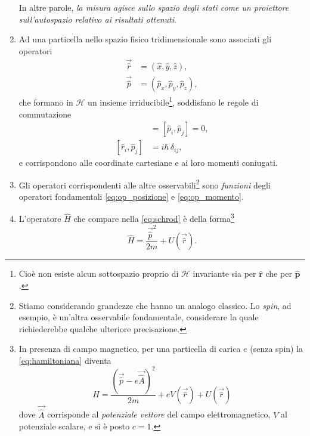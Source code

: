 \begin{enumerate}
{    In altre parole, \emph{la misura agisce sullo spazio degli stati come
    un \emph{proiettore} sull'autospazio 
    relativo ai risultati ottenuti}.
  }
  \item{
    Ad una particella nello spazio fisico tridimensionale sono associati
    gli operatori
    \begin{align}
      \vec{\hat{r}} &=  (\hat{x},   \hat{y},    \hat{z}), 
        \label{eq:op_posizione} \\
      \vec{\hat{p}} &=  (\hat{p}_x, \hat{p}_y,  \hat{p}_z),
        \label{eq:op_momento}
    \end{align}
    che formano in $\mathcal{H}$ un insieme irriducibile\footnote{
      Cioè non esiste alcun sottospazio proprio di $\mathcal{H}$ 
      invariante sia per $\mathbf{\hat{r}}$ che per $\mathbf{\hat{p}}$.
    }, soddisfano le regole di commutazione
    \begin{align}
      [\hat{r}_i, \hat{r}_j] &= [\hat{p}_i, \hat{p}_j] = 0, 
      	\label{eq:commutaz_qq_pp} \\
      [\hat{r}_i, \hat{p}_j] &= i\hbar \, \delta_{ij}, 
      	\label{eq:commutaz_qp}
    \end{align}
    e corrispondono alle coordinate cartesiane e ai loro momenti coniugati.
  }
  \item{
    Gli operatori corrispondenti alle altre osservabili\footnote{
      Stiamo considerando grandezze che hanno un analogo classico. 
      Lo \emph{spin}, ad esempio, è un'altra osservabile fondamentale,
      considerare la quale richiederebbe qualche ulteriore precisazione.
    }    
    sono \emph{funzioni} degli operatori fondamentali
    \eqref{eq:op_posizione} e \eqref{eq:op_momento}.
  }
  \item{
    L'operatore $\hat{H}$ che compare nella \eqref{eq:schrod} è
    della forma\footnote{
      In presenza di campo magnetico, per una particella di
      carica $e$ (senza spin) la \eqref{eq:hamiltoniana} diventa
      \[
        \hat{H} = \frac {(\vec{\hat{p}}-e\vec{\hat{A}})^2} {2m} 
        + eV(\vec{\hat{r}}) + U(\vec{\hat{r}})
      \]
    dove $\vec{\hat{A}}$ corrisponde al \emph{potenziale vettore} del campo
    elettromagnetico, $V$ al potenziale scalare, e si è posto $c=1$.
    }
    \begin{equation}
      \hat{H} = \frac{\vec{\hat{p}}^2}{2m} + U(  \vec{\hat{r}}    ) . 
      \label{eq:hamiltoniana}
    \end{equation}
  }
\end{enumerate}

